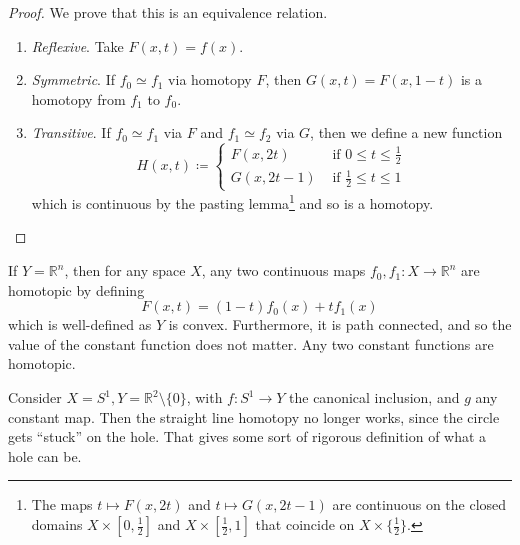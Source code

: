   \begin{proof}
    We prove that this is an equivalence relation. 
    \begin{enumerate}
      \item \textit{Reflexive}. Take $F(x, t) = f(x)$. 
      \item \textit{Symmetric}. If $f_0 \simeq f_1$ via homotopy $F$, then $G(x, t) = F(x, 1 - t)$ is a homotopy from $f_1$ to $f_0$. 
      \item \textit{Transitive}. If $f_0 \simeq f_1$ via $F$ and $f_1 \simeq f_2$ via $G$, then we define a new function 
        \begin{equation}
          H(x, t) \coloneqq \begin{cases} 
            F(x, 2t)  & \text{ if } 0 \leq t \leq \frac{1}{2} \\ 
            G(x, 2t - 1) & \text{ if } \frac{1}{2} \leq t \leq 1 
          \end{cases}
        \end{equation}
        which is continuous by the pasting lemma\footnote{The maps $t \mapsto F(x, 2t)$ and $t \mapsto G(x, 2t - 1)$ are continuous on the closed domains $X \times [0, \frac{1}{2}]$ and $X \times [\frac{1}{2}, 1]$ that coincide on $X \times \{\frac{1}{2}\}$.} and so is a homotopy. 
    \end{enumerate}
  \end{proof} 

  \begin{example}
    If $Y = \mathbb{R}^n$, then for any space $X$, any two continuous maps $f_0, f_1: X \to \mathbb{R}^n$ are homotopic by defining 
    \begin{equation}
      F(x, t) = (1 - t) f_0 (x) + t f_1 (x) 
    \end{equation}
    which is well-defined as $Y$ is convex. Furthermore, it is path connected, and so the value of the constant function does not matter. Any two constant functions are homotopic. 
  \end{example}

  \begin{example}
    Consider $X = S^1, Y = \mathbb{R}^2 \setminus \{0\}$, with $f: S^1 \to Y$ the canonical inclusion, and $g$ any constant map. Then the straight line homotopy no longer works, since the circle gets ``stuck'' on the hole. That gives some sort of rigorous definition of what a hole can be. 
  \end{example}


